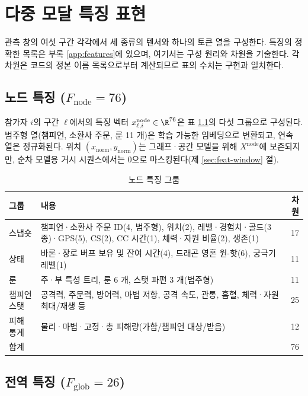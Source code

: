 \chapter{다중 모달 특징 표현}
\label{ch:features}

관측 창의 여섯 구간 각각에서 세 종류의 텐서와 하나의 토큰 열을 구성한다. 특징의 정확한 목록은 부록 \ref{app:features}에 있으며, 여기서는 구성 원리와 차원을 기술한다. 각 차원은 코드의 정본 이름 목록으로부터 계산되므로 표의 수치는 구현과 일치한다.

\section{노드 특징 ($F_{\mathrm{node}} = 76$)}
\label{sec:feat-node}

참가자 $i$의 구간 $\ell$에서의 특징 벡터 $x^{\mathrm{node}}_{\ell,i} \in \R^{76}$은 표 \ref{tab:node-groups}의 다섯 그룹으로 구성된다. 범주형 열(챔피언, 소환사 주문, 룬 11 개)은 학습 가능한 임베딩으로 변환되고, 연속 열은 정규화된다. 위치 $(x_{\mathrm{norm}}, y_{\mathrm{norm}})$는 그래프·공간 모델을 위해 $X^{\mathrm{node}}$에 보존되지만, 순차 모델용 거시 시퀀스에서는 0으로 마스킹된다(제 \ref{sec:feat-window} 절).

\begin{table}[htbp]
  \centering
  \caption{노드 특징 그룹}
  \label{tab:node-groups}
  \small
  \begin{tabularx}{\linewidth}{@{}lXr@{}}
    \toprule
    그룹 & 내용 & 차원 \\
    \midrule
    스냅숏 & 챔피언·소환사 주문 ID(4, 범주형), 위치(2), 레벨·경험치·골드(3종)·GPS(5), CS(2), CC 시간(1), 체력·자원 비율(2), 생존(1) & 17 \\
    상태 & 바론·장로 버프 보유 및 잔여 시간(4), 드래곤 영혼 원-핫(6), 궁극기 레벨(1) & 11 \\
    룬 & 주·부 특성 트리, 룬 6 개, 스탯 파편 3 개(범주형) & 11 \\
    챔피언 스탯 & 공격력, 주문력, 방어력, 마법 저항, 공격 속도, 관통, 흡혈, 체력·자원 최대/재생 등 & 25 \\
    피해 통계 & 물리·마법·고정·총 피해량(가함/챔피언 대상/받음) & 12 \\
    \midrule
    합계 & & 76 \\
    \bottomrule
  \end{tabularx}
\end{table}

\section{전역 특징 ($F_{\mathrm{glob}} = 26$)}
\label{sec:feat-global}

